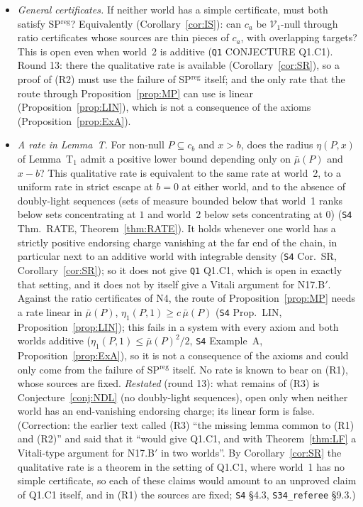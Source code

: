 \documentclass[11pt]{article}
\theoremstyle{definition}
\theoremstyle{remark}
\newcommand{\src}[1]{\texttt{#1}}
\begin{document}
\begin{itemize}[leftmargin=*]
\item[\textbf{(R2)}] \emph{General certificates.} If neither world has a simple certificate, must both satisfy SP$^{\mathrm{reg}}$? Equivalently (Corollary~\ref{cor:IS}): can $c_a$ be $\mathcal V_1$-null through ratio certificates whose sources are thin pieces of $c_a$, with overlapping targets? This is open even when world~2 is additive (\src{Q1} CONJECTURE Q1.C1). Round 13: there the qualitative rate is available (Corollary~\ref{cor:SR}), so a proof of (R2) must use the failure of SP$^{\mathrm{reg}}$ itself; and the only rate that the route through Proposition~\ref{prop:MP} can use is linear (Proposition~\ref{prop:LIN}), which is not a consequence of the axioms (Proposition~\ref{prop:ExA}).
\item[\textbf{(R3)}] \emph{A rate in Lemma~T.} For non-null $P\subseteq c_b$ and $x>b$, does the radius $\eta(P,x)$ of Lemma~T$_1$ admit a positive lower bound depending only on $\bar\mu(P)$ and $x-b$? This qualitative rate is equivalent to the same rate at world~2, to a uniform rate in strict escape at $b=0$ at either world, and to the absence of doubly-light sequences (sets of measure bounded below that world~1 ranks below sets concentrating at $1$ and world~2 below sets concentrating at $0$) (\src{S4} Thm.~RATE, Theorem~\ref{thm:RATE}). It holds whenever one world has a strictly positive endorsing charge vanishing at the far end of the chain, in particular next to an additive world with integrable density (\src{S4} Cor.~SR, Corollary~\ref{cor:SR}); so it does not give \src{Q1} Q1.C1, which is open in exactly that setting, and it does not by itself give a Vitali argument for N17.B$'$. Against the ratio certificates of N4, the route of Proposition~\ref{prop:MP} needs a rate linear in $\bar\mu(P)$, $\eta_1(P,1)\ge c\,\bar\mu(P)$ (\src{S4} Prop.~LIN, Proposition~\ref{prop:LIN}); this fails in a system with every axiom and both worlds additive ($\eta_1(P,1)\le\bar\mu(P)^2/2$, \src{S4} Example~A, Proposition~\ref{prop:ExA}), so it is not a consequence of the axioms and could only come from the failure of SP$^{\mathrm{reg}}$ itself. No rate is known to bear on (R1), whose sources are fixed. \emph{Restated} (round 13): what remains of (R3) is Conjecture~\ref{conj:NDL} (no doubly-light sequences), open only when neither world has an end-vanishing endorsing charge; its linear form is false. (Correction: the earlier text called (R3) ``the missing lemma common to (R1) and (R2)'' and said that it ``would give Q1.C1, and with Theorem~\ref{thm:LF} a Vitali-type argument for N17.B$'$ in two worlds''. By Corollary~\ref{cor:SR} the qualitative rate is a theorem in the setting of Q1.C1, where world~1 has no simple certificate, so each of these claims would amount to an unproved claim of Q1.C1 itself, and in (R1) the sources are fixed; \src{S4} \S4.3, \src{S34\_referee} \S9.3.)

\end{itemize}
\end{document}
